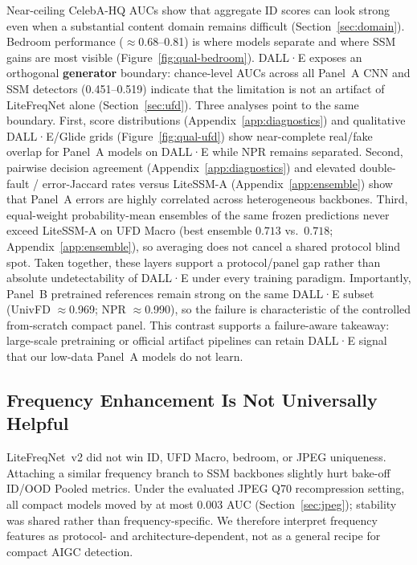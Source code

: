 Near-ceiling CelebA-HQ AUCs show that aggregate ID scores can look strong even when a substantial content domain remains difficult (Section~\ref{sec:domain}).
Bedroom performance ($\approx$0.68--0.81) is where models separate and where SSM gains are most visible (Figure~\ref{fig:qual-bedroom}).
DALL·E exposes an orthogonal \textbf{generator} boundary: chance-level AUCs across all Panel~A CNN and SSM detectors (0.451--0.519) indicate that the limitation is not an artifact of LiteFreqNet alone (Section~\ref{sec:ufd}).
Three analyses point to the same boundary.
First, score distributions (Appendix~\ref{app:diagnostics}) and qualitative DALL·E/Glide grids (Figure~\ref{fig:qual-ufd}) show near-complete real/fake overlap for Panel~A models on DALL·E while NPR remains separated.
Second, pairwise decision agreement (Appendix~\ref{app:diagnostics}) and elevated double-fault / error-Jaccard rates versus LiteSSM-A (Appendix~\ref{app:ensemble}) show that Panel~A errors are highly correlated across heterogeneous backbones.
Third, equal-weight probability-mean ensembles of the same frozen predictions never exceed LiteSSM-A on UFD Macro (best ensemble $0.713$ vs.\ $0.718$; Appendix~\ref{app:ensemble}), so averaging does not cancel a shared protocol blind spot.
Taken together, these layers support a protocol/panel gap rather than absolute undetectability of DALL·E under every training paradigm.
Importantly, Panel~B pretrained references remain strong on the same DALL·E subset (UnivFD $\approx$0.969; NPR $\approx$0.990), so the failure is characteristic of the controlled from-scratch compact panel.
This contrast supports a failure-aware takeaway: large-scale pretraining or official artifact pipelines can retain DALL·E signal that our low-data Panel~A models do not learn.

\subsection{Frequency Enhancement Is Not Universally Helpful}

LiteFreqNet~v2 did not win ID, UFD Macro, bedroom, or JPEG uniqueness.
Attaching a similar frequency branch to SSM backbones slightly hurt bake-off ID/OOD Pooled metrics.
Under the evaluated JPEG Q70 recompression setting, all compact models moved by at most 0.003 AUC (Section~\ref{sec:jpeg}); stability was shared rather than frequency-specific.
We therefore interpret frequency features as protocol- and architecture-dependent, not as a general recipe for compact AIGC detection.

